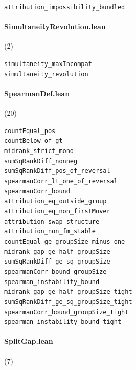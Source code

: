 {\footnotesize
\texttt{attribution\_impossibility\_bundled}\\
}

\paragraph{SimultaneityRevolution.lean} (2)

{\footnotesize
\texttt{simultaneity\_maxIncompat}\\
\texttt{simultaneity\_revolution}\\
}

\paragraph{SpearmanDef.lean} (20)

{\footnotesize
\texttt{countEqual\_pos}\\
\texttt{countBelow\_of\_gt}\\
\texttt{midrank\_strict\_mono}\\
\texttt{sumSqRankDiff\_nonneg}\\
\texttt{sumSqRankDiff\_pos\_of\_reversal}\\
\texttt{spearmanCorr\_lt\_one\_of\_reversal}\\
\texttt{spearmanCorr\_bound}\\
\texttt{attribution\_eq\_outside\_group}\\
\texttt{attribution\_eq\_non\_firstMover}\\
\texttt{attribution\_swap\_structure}\\
\texttt{attribution\_non\_fm\_stable}\\
\texttt{countEqual\_ge\_groupSize\_minus\_one}\\
\texttt{midrank\_gap\_ge\_half\_groupSize}\\
\texttt{sumSqRankDiff\_ge\_sq\_groupSize}\\
\texttt{spearmanCorr\_bound\_groupSize}\\
\texttt{spearman\_instability\_bound}\\
\texttt{midrank\_gap\_ge\_half\_groupSize\_tight}\\
\texttt{sumSqRankDiff\_ge\_sq\_groupSize\_tight}\\
\texttt{spearmanCorr\_bound\_groupSize\_tight}\\
\texttt{spearman\_instability\_bound\_tight}\\
}

\paragraph{SplitGap.lean} (7)

